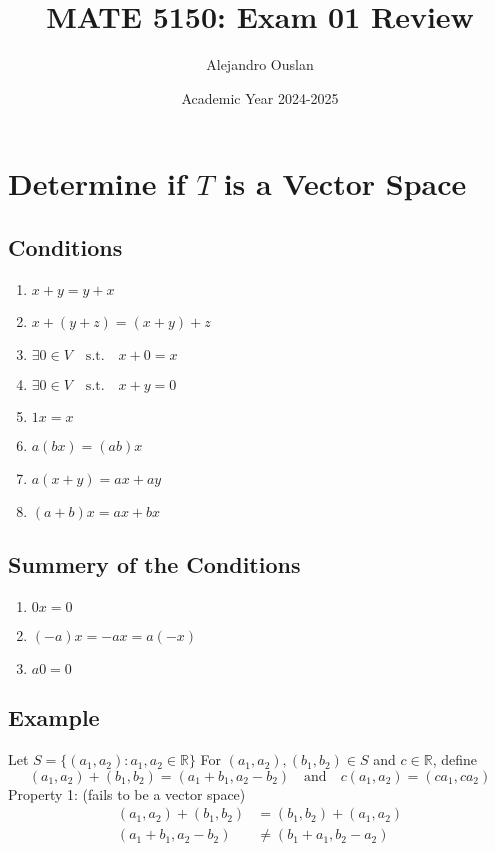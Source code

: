 \documentclass[10pt, oneside]{article}
\title{MATE 5150: Exam 01 Review}
\author{Alejandro Ouslan}
\date{Academic Year 2024-2025}
\newcommand{\R}{\mathbb{R}}
\begin{document}
\maketitle
\tableofcontents

\vspace{.25in}

\section{Determine if $T$ is a Vector Space}

\subsection{Conditions}
\begin{enumerate}
	\item $x + y  = y + x$
	\item $x + (y + z) = (x + y) + z$
	\item $\exists 0 \in V \quad \text{s.t.} \quad x + 0 = x$
	\item $\exists 0 \in V \quad \text{s.t.} \quad x + y = 0$
	\item $1x = x$
	\item $a(bx) = (ab)x$
	\item $a(x + y) = ax + ay$
	\item $(a + b)x = ax + bx$
\end{enumerate}

\subsection{Summery of the Conditions}
\begin{enumerate}
	\item $0x = 0$
	\item $(-a)x = -ax = a(-x)$
	\item $a0 = 0$
\end{enumerate}
\subsection{Example}

Let $S = \{(a_1, a_2): a_1, a_2 \in \R\}$ For $(a_1, a_2), (b_1, b_2) \in S$ and $c \in \R$, define
\[
	(a_1, a_2) + (b_1, b_2) = (a_1 + b_1, a_2 - b_2) \quad \text{and} \quad c(a_1, a_2) = (ca_1, ca_2)
\]
Property 1: (fails to be a vector space)
\[
	\begin{split}
		(a_1, a_2) + (b_1, b_2) &= (b_1, b_2) + (a_1, a_2) \\
		(a_1 + b_1, a_2 - b_2) &\neq (b_1 + a_1, b_2 - a_2) \\
	\end{split}
\]
\end{document}
